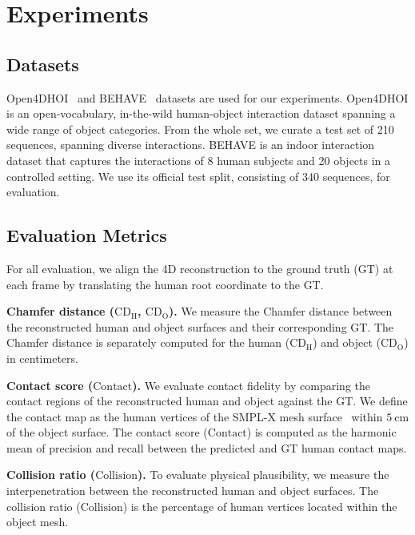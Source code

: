 \section{Experiments}
\label{sec:experiments}

\subsection{Datasets}
Open4DHOI~\cite{wen2025efficient} and BEHAVE~\cite{bhatnagar2022behave} datasets are used for our experiments.
Open4DHOI is an open-vocabulary, in-the-wild human-object interaction dataset spanning a wide range of object categories.
From the whole set, we curate a test set of 210 sequences, spanning diverse interactions.
BEHAVE is an indoor interaction dataset that captures the interactions of 8 human subjects and 20 objects in a controlled setting.
We use its official test split, consisting of 340 sequences, for evaluation.


\subsection{Evaluation Metrics}
\label{sec:evaluation_metrics}
For all evaluation, we align the 4D reconstruction to the ground truth (GT) at each frame by translating the human root coordinate to the GT.


\noindent\textbf{Chamfer distance ($\text{CD}_{\text{H}}$, $\text{CD}_{\text{O}}$).}
We measure the Chamfer distance between the reconstructed human and object surfaces and their corresponding GT.
The Chamfer distance is separately computed for the human ($\text{CD}_{\text{H}}$) and object ($\text{CD}_{\text{O}}$) in centimeters.


\noindent\textbf{Contact score ($\text{Contact}$).}
We evaluate contact fidelity by comparing the contact regions of the reconstructed human and object against the GT.
We define the contact map as the human vertices of the SMPL-X mesh surface~\cite{pavlakos2019expressive} within $5~\text{cm}$ of the object surface.
The contact score ($\text{Contact}$) is computed as the harmonic mean of precision and recall between the predicted and GT human contact maps.


\noindent\textbf{Collision ratio ($\text{Collision}$).}
To evaluate physical plausibility, we measure the interpenetration between the reconstructed human and object surfaces.
The collision ratio ($\text{Collision}$) is the percentage of human vertices located within the object mesh.


